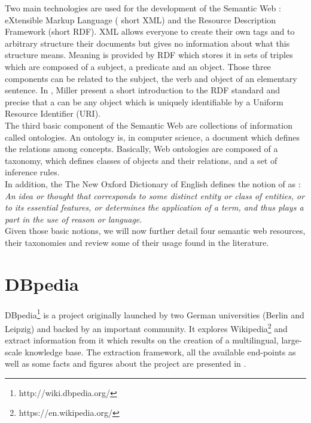 Two main technologies are used for the development of the Semantic Web : eXtensible Markup Language ( short XML) and the Resource Description Framework (short RDF). XML allows everyone to create their own tags and to arbitrary structure their documents but gives no information about what this structure means. Meaning is provided by RDF which stores it in sets of triples which are composed of a subject, a predicate and an object. Those three components can be related to the subject, the verb and object of an elementary sentence. In \cite{miller1998introduction}, Miller present a short introduction to the RDF standard and precise that a  can be any object which is uniquely identifiable by a Uniform Resource Identifier (URI).\\

The third basic component of the Semantic Web are collections of information called ontologies. An ontology is, in computer science, a document which defines the relations among concepts. Basically, Web ontologies are composed of a taxonomy, which defines classes of objects and their relations, and a set of inference rules.\\

In addition, the The New Oxford Dictionary of English defines the notion of  as : \emph{An idea or thought that corresponds to some distinct entity or class of entities, or to its essential features, or determines the application of a term, and thus plays a part in the use of reason or language}.\\

Given those basic notions, we will now further detail four semantic web resources, their taxonomies and review some of their usage found in the literature.


\section{DBpedia} %
\label{sec:dbpedia}

DBpedia\footnote{http://wiki.dbpedia.org/} is a project originally launched by two German universities (Berlin and Leipzig) and backed by an important community. It explores Wikipedia\footnote{https://en.wikipedia.org/} and extract information from it which results on the creation of a multilingual, large-scale knowledge base. The extraction framework, all the available end-points as well as some facts and figures about the project are presented in \cite{lehmann2014dbpedia}.\\

